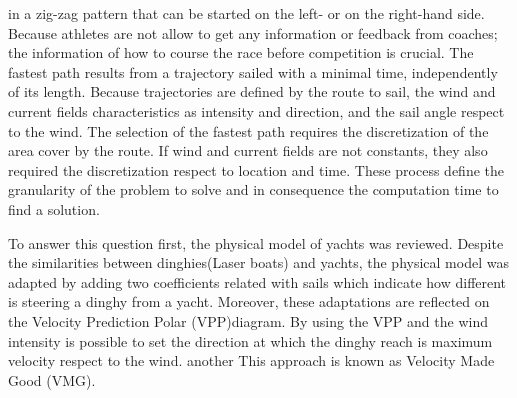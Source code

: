 in a zig-zag pattern that can be started on the left- or on the right-hand side. 
Because athletes are not allow to get any information or feedback from coaches; the information of how to course the race before competition is crucial. \newline
The fastest path results from a trajectory sailed with a minimal time, independently of its length. Because trajectories are defined by the route to sail, the wind and current fields characteristics as intensity and direction, and the sail angle respect to the wind. The selection of the fastest path requires the discretization of the area cover by the route. If wind and current fields are not constants, they also required the discretization respect to location and time. These process define the granularity of the problem to solve and in consequence the computation time to find a solution. %


To answer this question first, the physical model of yachts was reviewed. Despite the similarities between dinghies(Laser boats) and yachts, the physical model was adapted by adding two coefficients related with sails which indicate%
how different is steering a dinghy from a yacht. Moreover, these adaptations are reflected on the %
Velocity Prediction Polar (VPP)diagram. By using the VPP and the wind intensity is possible to set the direction at which the dinghy reach is maximum velocity respect to the wind. another This approach is known as Velocity Made Good (VMG).%

